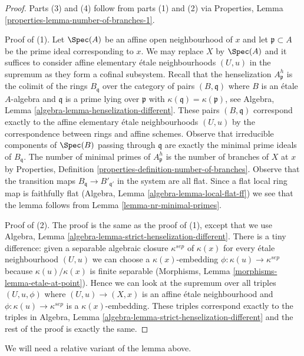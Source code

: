 \begin{proof}
Parts (3) and (4) follow from parts (1) and (2) via
Properties, Lemma \ref{properties-lemma-number-of-branches-1}.

\medskip\noindent
Proof of (1). Let $\Spec(A)$ be an affine open neighbourhood
of $x$ and let $\mathfrak p \subset A$ be the prime ideal
corresponding to $x$. We may replace $X$ by $\Spec(A)$ and
it suffices to consider affine elementary \'etale neighbourhoods
$(U, u)$ in the supremum as they form a cofinal subsystem.
Recall that the henselization $A_\mathfrak p^h$
is the colimit of the rings $B_\mathfrak q$ over the category
of pairs $(B, \mathfrak q)$ where $B$ is an \'etale $A$-algebra
and $\mathfrak q$ is a prime lying over $\mathfrak p$ with
$\kappa(\mathfrak q) = \kappa(\mathfrak p)$, see
Algebra, Lemma \ref{algebra-lemma-henselization-different}.
These pairs $(B, \mathfrak q)$ correspond exactly to
the affine elementary \'etale neighbourhoods $(U, u)$
by the correspondence between rings and affine schemes.
Observe that irreducible components of $\Spec(B)$
passing through $\mathfrak q$ are exactly the minimal
prime ideals of $B_\mathfrak q$. The number of minimal
primes of $A_\mathfrak p^h$ is the number of branches
of $X$ at $x$ by Properties, Definition
\ref{properties-definition-number-of-branches}.
Observe that the transition
maps $B_\mathfrak q \to B'_{\mathfrak q'}$ in the system
are all flat. Since a flat local ring map is faithfully flat
(Algebra, Lemma \ref{algebra-lemma-local-flat-ff})
we see that the lemma follows
from Lemma \ref{lemma-nr-minimal-primes}.

\medskip\noindent
Proof of (2). The proof is the same as the proof of (1), except that we use
Algebra, Lemma \ref{algebra-lemma-strict-henselization-different}.
There is a tiny difference: given a separable algebraic closure
$\kappa^{sep}$ of $\kappa(x)$ for every \'etale neighbourhood
$(U, u)$ we can choose a $\kappa(x)$-embedding
$\phi : \kappa(u) \to \kappa^{sep}$
because $\kappa(u)/\kappa(x)$ is finite separable
(Morphisms, Lemma \ref{morphisms-lemma-etale-at-point}).
Hence we can look at the supremum over all triples
$(U, u, \phi)$ where $(U, u) \to (X, x)$ is an affine
\'etale neighbourhood and $\phi : \kappa(u) \to \kappa^{sep}$
is a $\kappa(x)$-embedding. These triples correspond
exactly to the triples in
Algebra, Lemma \ref{algebra-lemma-strict-henselization-different}
and the rest of the proof is exactly the same.
\end{proof}

\noindent
We will need a relative variant of the lemma above.


